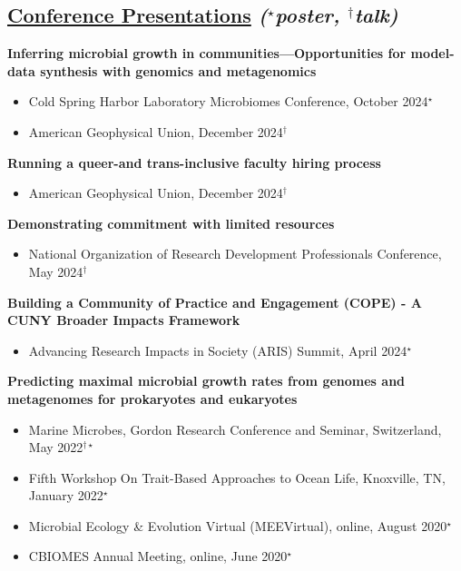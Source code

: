 \documentclass[]{res}
\begin{document}
\begin{resume}
 \section{\underline{Conference Presentations} \emph{{($^{\star}$poster, $^{\dagger}$talk)}}} \vspace{2mm}
 
 {\bf Inferring microbial growth in communities—Opportunities for model-data synthesis
with genomics and metagenomics}
 \begin{itemize}
 \item Cold Spring Harbor Laboratory Microbiomes Conference, October 2024$^{\star}$
 \item American Geophysical Union, December 2024$^{\dagger}$
 \end{itemize}  
 
  {\bf Running a queer-and trans-inclusive faculty hiring process}
 \begin{itemize}
 \item American Geophysical Union, December 2024$^{\dagger}$
 \end{itemize}  
 
 \newpage
 
 {\bf Demonstrating commitment with limited resources}
 \begin{itemize}
 \item National Organization of Research Development Professionals Conference, May 2024$^{\dagger}$
 \end{itemize} 
 
 {\bf Building a Community of Practice and Engagement (COPE) - A CUNY Broader Impacts Framework}
 \begin{itemize}
 \item Advancing Research Impacts in Society (ARIS) Summit, April 2024$^{\star}$
 \end{itemize}
 
 {\bf Predicting maximal microbial growth rates from genomes and metagenomes for prokaryotes and eukaryotes}
 \begin{itemize}
 \item Marine Microbes, Gordon Research Conference and Seminar, Switzerland, May 2022$^{\dagger\star}$
 \item Fifth Workshop On Trait-Based Approaches to Ocean Life, Knoxville, TN, January 2022$^{\star}$
 \item Microbial Ecology \& Evolution Virtual (MEEVirtual), online, August 2020$^{\star}$
 \item CBIOMES Annual Meeting, online, June 2020$^{\star}$
 \end{itemize}
 

\end{resume}
\end{document}
